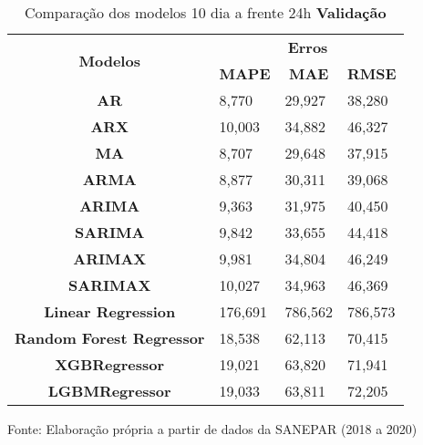 \begin{table}[H]
	\centering
	\caption{Comparação dos modelos 10 dia a frente 24h \textbf{Validação} }\label{tb:10-24vld}
	\begin{tabular}{@{}clll@{}}
		\toprule
		\multirow{2}{*}{\textbf{Modelos}} & \multicolumn{3}{c}{\textbf{Erros}}                                                                       \\ \cmidrule(l){2-4} 
		& \multicolumn{1}{c}{\textbf{MAPE}} & \multicolumn{1}{c}{\textbf{MAE}} & \multicolumn{1}{c}{\textbf{RMSE}} \\ \hline
\textbf{AR}                       & 8,770                             & 29,927                           & 38,280                            \\
\textbf{ARX}                      & 10,003                            & 34,882                           & 46,327                            \\
\textbf{MA}                       & 8,707                             & 29,648                           & 37,915                            \\
\textbf{ARMA}                     & 8,877                             & 30,311                           & 39,068                            \\
\textbf{ARIMA}                    & 9,363                             & 31,975                           & 40,450                            \\
\textbf{SARIMA}                   & 9,842                             & 33,655                           & 44,418                            \\
\textbf{ARIMAX}                   & 9,981                             & 34,804                           & 46,249                            \\
\textbf{SARIMAX}                  & 10,027                            & 34,963                           & 46,369                            \\
\textbf{Linear Regression}        & 176,691                           & 786,562                          & 786,573                           \\
\textbf{Random Forest Regressor}  & 18,538                            & 62,113                           & 70,415                            \\
\textbf{XGBRegressor}             & 19,021                            & 63,820                           & 71,941                            \\
\textbf{LGBMRegressor}            & 19,033                            & 63,811                           & 72,205                            \\ \bottomrule
	\end{tabular}

Fonte: Elaboração própria a partir de dados da SANEPAR (2018 a 2020)
\end{table}

